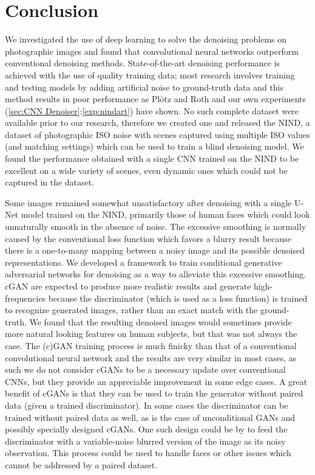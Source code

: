 \chapter{Conclusion}

We investigated the use of deep learning to solve the denoising problems on photographic images and found that convolutional neural networks outperform conventional denoising methods. State-of-the-art denoising performance is achieved with the use of quality training data; most research involves training and testing models by adding artificial noise to ground-truth data and this method results in poor performance as Plötz and Roth \cite{darmstadt} and our own experiments (\ref{sec:CNN Denoiser}:\ref{exp:nindart}) have shown. No such complete dataset were available prior to our research, therefore we created one and released the \acf{NIND}, a dataset of photographic ISO noise with scenes captured using multiple ISO values (and matching settings) which can be used to train a blind denoising model. We found the performance obtained with a single \acl{CNN} trained on the \ac{NIND} to be excellent on a wide variety of scenes, even dynamic ones which could not be captured in the dataset.

Some images remained somewhat unsatisfactory after denoising with a single U-Net model trained on the \ac{NIND}, primarily those of human faces which could look unnaturally smooth in the absence of noise. The excessive smoothing is normally caused by the conventional loss function which favors a blurry result because there is a one-to-many mapping between a noisy image and its possible denoised representations. We developed a framework to train conditional generative adversarial networks for denoising as a way to alleviate this excessive smoothing. \ac{cGAN} are expected to produce more realistic results and generate high-frequencies because the discriminator (which is used as a loss function) is trained to recognize generated images, rather than an exact match with the ground-truth. We found that the resulting denoised images would sometimes provide more natural looking features on human subjects, but that was not always the case. The (c)\ac{GAN} training process is much finicky than that of a conventional convolutional neural network and the results are very similar in most cases, as such we do not consider \acp{cGAN} to be a necessary update over conventional \acp{CNN}, but they provide an appreciable improvement in some edge cases. A great benefit of \acp{cGAN} is that they can be used to train the generator without paired data (given a trained discriminator). In some cases the discriminator can be trained without paired data as well, as is the case of unconditional \acp{GAN} and possibly specially designed \acp{cGAN}. One such design could be by to feed the discriminator with a variable-noise blurred version of the image as its noisy observation. This process could be used to handle faces or other issues which cannot be addressed by a paired dataset.

